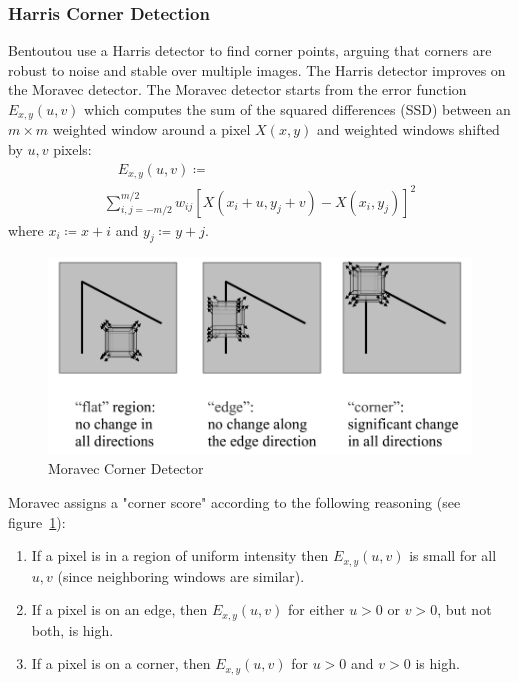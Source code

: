 \subsubsection{Harris Corner Detection}
Bentoutou \etal\cite{bentoutou2005automatic} use a Harris detector\cite{harris1988combined} to find corner points, arguing that corners are robust to noise and stable over multiple images.
%
The Harris detector improves on the Moravec\cite{moravec1980obstacle} detector.
%
The Moravec detector starts from the error function \(E_{x,y}(u,v)\) which computes the sum of the squared differences (SSD) between an \(m \times m\) weighted window around a pixel \(X(x, y)\) and weighted windows shifted by \(u,v\) pixels:
\begin{multline}
	\quad E_{x,y}(u,v) \coloneqq \\ \sum_{i,j=-m/2}^{m/2} w_{ij}\left[ X(x_i+ u,y_j+v) - X(x_i, y_j)\right]^2
	\label{moravecerrorfunction}
\end{multline}
where \(x_i \coloneqq x + i\) and \(y_j \coloneqq y+j\).
\begin{figure}
	\centering
	\includegraphics[width=\linewidth,keepaspectratio]{figures/registration/corners.png}
	\caption{Moravec Corner Detector}
	\label{fig:corners}
\end{figure}
Moravec assigns a "corner score" according to the following reasoning (see figure~\ref{fig:corners}):
\begin{framed}
	\begin{enumerate}
		\item If a pixel is in a region of uniform intensity then \(E_{x,y}(u,v)\) is small for all \(u,v\) (since neighboring windows are similar).
		\item If a pixel is on an edge, then \(E_{x,y}(u,v)\) for either \(u > 0\) or \(v > 0\), but not both, is high.
		\item If a pixel is on a corner, then \(E_{x,y}(u,v)\) for \(u > 0\) and \(v > 0\) is high.
	\end{enumerate}
\end{framed}
